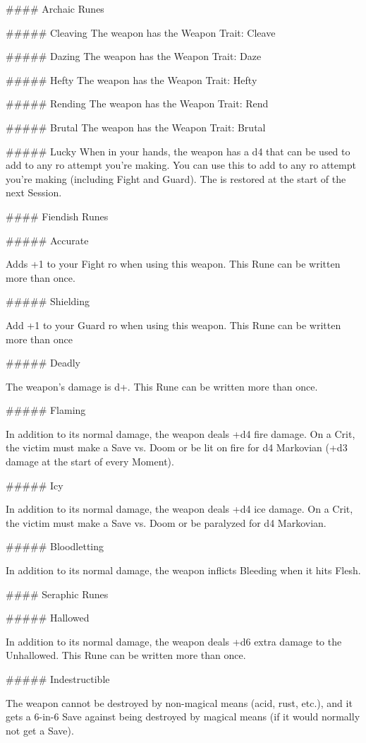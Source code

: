 #### Archaic Runes

##### Cleaving
The weapon has the Weapon Trait: Cleave

##### Dazing
The weapon has the Weapon Trait: Daze

##### Hefty
The weapon has the Weapon Trait: Hefty

##### Rending
The weapon has the Weapon Trait: Rend

##### Brutal
The weapon has the Weapon Trait: Brutal

##### Lucky
When in your hands, the weapon has a d4 \UD that can be used to add to any {ro} attempt you're making. You can use this \UD to add to any {ro} attempt you're making (including Fight and Guard).  The \UD is restored at the start of the next Session.

#### Fiendish Runes

##### Accurate

Adds +1 to your Fight {ro} when using this weapon.  This Rune can be written more than once.

##### Shielding

Add +1 to your Guard {ro} when using this weapon.  This Rune can be written more than once

##### Deadly

The weapon's damage is {d+}.  This Rune can be written more than once.

##### Flaming

In addition to its normal damage, the weapon deals +d4 fire damage.  On a Crit, the victim must make a Save vs. Doom or be lit on fire for d4 Markovian (+d3 damage at the start of every Moment).

##### Icy

In addition to its normal damage, the weapon deals +d4 ice damage.  On a Crit, the victim must make a Save vs. Doom or be paralyzed for d4 Markovian.

##### Bloodletting

In addition to its normal damage, the weapon inflicts Bleeding when it hits Flesh.




#### Seraphic Runes


##### Hallowed

In addition to its normal damage, the weapon deals +d6 extra damage to the Unhallowed.  This Rune can be written more than once.

##### Indestructible

The weapon cannot be destroyed by non-magical means (acid, rust, etc.), and it gets a 6-in-6 Save against being destroyed by magical means (if it would normally not get a Save).

